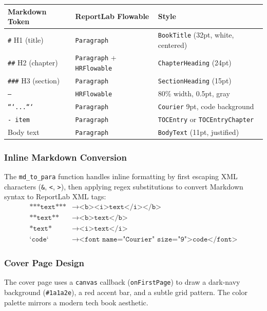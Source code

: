 \documentclass[11pt,a4paper]{article}
\begin{document}
\begin{center}
\begin{tabular}{lll}
\toprule
\textbf{Markdown Token} & \textbf{ReportLab Flowable} & \textbf{Style}\\
\midrule
\texttt{\#} H1 (title) & \texttt{Paragraph} & \texttt{BookTitle} (32pt, white, centered)\\
\texttt{\#\#} H2 (chapter) & \texttt{Paragraph} + \texttt{HRFlowable} & \texttt{ChapterHeading} (24pt)\\
\texttt{\#\#\#} H3 (section) & \texttt{Paragraph} & \texttt{SectionHeading} (15pt)\\
\texttt{---} & \texttt{HRFlowable} & 80\% width, 0.5pt, gray\\
\texttt{```...```} & \texttt{Paragraph} & \texttt{Courier} 9pt, code background\\
\texttt{- item} & \texttt{Paragraph} & \texttt{TOCEntry} or \texttt{TOCEntryChapter}\\
Body text & \texttt{Paragraph} & \texttt{BodyText} (11pt, justified)\\
\bottomrule
\end{tabular}
\end{center}

\subsubsection{Inline Markdown Conversion}

The \texttt{md\_to\_para} function handles inline formatting by first escaping XML characters (\texttt{\&}, \texttt{<}, \texttt{>}), then applying regex substitutions to convert Markdown syntax to ReportLab XML tags:
\begin{align}
\texttt{***text***} &\to \texttt{<b><i>text</i></b>}\\
\texttt{**text**} &\to \texttt{<b>text</b>}\\
\texttt{*text*} &\to \texttt{<i>text</i>}\\
\texttt{`code`} &\to \texttt{<font name="Courier" size="9">code</font>}
\end{align}

\subsubsection{Cover Page Design}

The cover page uses a \texttt{canvas} callback (\texttt{onFirstPage}) to draw a dark-navy background (\texttt{\#1a1a2e}), a red accent bar, and a subtle grid pattern. The color palette mirrors a modern tech book aesthetic.
\end{document}
